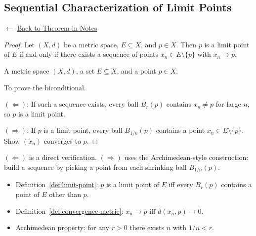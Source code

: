 
\subsection*{Sequential Characterization of Limit Points}
\label{prf:seq-char-limit}

\begin{remark*}[Return]
$\leftarrow$ \hyperref[thm:seq-char-limit]{Back to Theorem in Notes}
\end{remark*}

\begin{proof}
\Claim Let $(X,d)$ be a metric space, $E \subseteq X$, and $p \in X$.
Then $p$ is a limit point of $E$ if and only if there exists a sequence
of points $x_n \in E \setminus \{p\}$ with $x_n \to p$.

\Given A metric space $(X,d)$, a set $E \subseteq X$, and a point $p \in X$.

\Goal To prove the biconditional.

\Strategy
$(\Leftarrow)$: If such a sequence exists, every ball $B_r(p)$ contains
$x_n \neq p$ for large $n$, so $p$ is a limit point.

$(\Rightarrow)$: If $p$ is a limit point, every ball $B_{1/n}(p)$ contains
a point $x_n \in E \setminus \{p\}$. Show $(x_n)$ converges to $p$.


\end{proof}

\begin{remark*}
$(\Leftarrow)$ is a direct verification.
$(\Rightarrow)$ uses the Archimedean-style construction: build a sequence
by picking a point from each shrinking ball $B_{1/n}(p)$.
\end{remark*}

\begin{remark*}[Dependencies]
\begin{itemize}
  \item Definition~\ref{def:limit-point}: $p$ is a limit point of $E$ iff every
        $B_r(p)$ contains a point of $E$ other than $p$.
  \item Definition~\ref{def:convergence-metric}: $x_n \to p$ iff $d(x_n,p) \to 0$.
  \item Archimedean property: for any $r > 0$ there exists $n$ with $1/n < r$.
\end{itemize}
\end{remark*}
